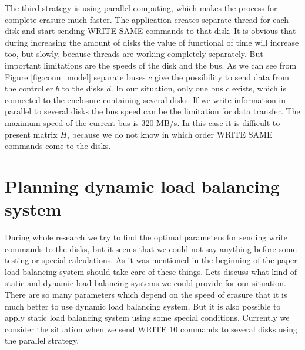 The third strategy is using parallel computing, which makes the process for complete erasure much faster. The application creates separate thread for each disk and start sending WRITE SAME commands to that disk. It is obvious that during increasing the amount of disks the value of functional of time will increase too, but slowly, because threads are working completely separately. But important limitations are the speeds of the disk and the bus. As we can see from Figure \ref{fig:conn_model} separate buses $c$ give the possibility to send data from the controller $b$ to the disks $d$. In our situation, only one bus $c$ exists, which is connected to the enclosure containing several disks. If we write information in parallel to several disks the bus speed can be the limitation for data transfer. The maximum speed of the current bus is 320 MB/s. In this case it is difficult to present matrix $H$, because we do not know in which order WRITE SAME commands come to the disks.


\section{Planning dynamic load balancing system}

During whole research we try to find the optimal parameters for sending write commands to the disks, but it seems that we could not say anything before some testing or special calculations. As it was mentioned in the beginning of the paper load balancing system should take care of these things. Lets discuss what kind of static and dynamic load balancing systems we could provide for our situation. There are so many parameters which depend on the speed of erasure that it is much better to use dynamic load balancing system. But it is also possible to apply static load balancing system using some special conditions. Currently we consider the situation when we send WRITE 10 commands to several disks using the parallel strategy. 

